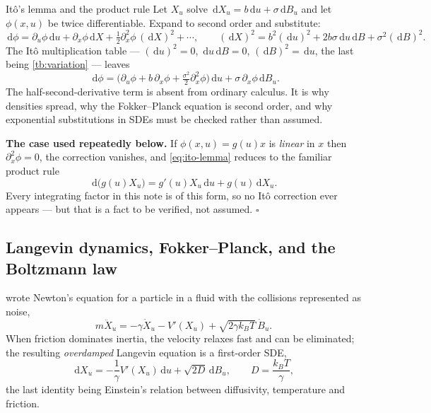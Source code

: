 \documentclass[11pt,a4paper]{article}
\newcommand{\dd}{\,\mathrm d}
\newcounter{toolbox}
\begin{document}
\begin{toolbox}{It\^o's lemma and the product rule}\label{tb:ito-lemma}
Let $X_u$ solve $\dd X_u=b\dd u+\sigma\dd B_u$ and let $\phi(x,u)$ be twice differentiable.
Expand to second order and substitute:
\[
 \dd\phi
 =\partial_u\phi\dd u+\partial_x\phi\dd X+\tfrac12\partial_x^2\phi\,(\dd X)^2+\cdots,
 \qquad
 (\dd X)^2=b^2(\dd u)^2+2b\sigma\dd u\dd B+\sigma^2(\dd B)^2 .
\]
The It\^o multiplication table --- $(\dd u)^2=0$, $\dd u\dd B=0$,
$(\dd B)^2=\dd u$, the last being \cref{tb:variation} --- leaves
\begin{equation}
 \boxed{\;\dd\phi
 =\Big(\partial_u\phi+b\,\partial_x\phi+\tfrac{\sigma^2}{2}\partial_x^2\phi\Big)\dd u
 +\sigma\,\partial_x\phi\dd B_u .}
 \label{eq:ito-lemma}
\end{equation}
The half-second-derivative term is absent from ordinary calculus. It is why densities spread,
why the Fokker--Planck equation is second order, and why exponential substitutions in SDEs
must be checked rather than assumed.

\textbf{The case used repeatedly below.} If $\phi(x,u)=g(u)x$ is \emph{linear} in $x$ then
$\partial_x^2\phi=0$, the correction vanishes, and \eqref{eq:ito-lemma} reduces to the
familiar product rule
\begin{equation}
 \dd\big(g(u)X_u\big)=g'(u)X_u\dd u+g(u)\dd X_u .
 \label{eq:product-rule}
\end{equation}
Every integrating factor in this note is of this form, so no It\^o correction ever appears ---
but that is a fact to be verified, not assumed. \hfill$\square$
\end{toolbox}

\subsection{Langevin dynamics, Fokker--Planck, and the Boltzmann law}\label{sec:langevin}

\citet{langevin1908theorie} wrote Newton's equation for a particle in a fluid with the
collisions represented as noise,
\begin{equation}
 m\ddot X_u=-\gamma\dot X_u-V'(X_u)+\sqrt{2\gamma k_BT}\,\dot B_u .
 \label{eq:langevin-full}
\end{equation}
When friction dominates inertia, the velocity relaxes fast and can be eliminated; the
resulting \emph{overdamped} Langevin equation is a first-order SDE,
\begin{equation}
 \dd X_u=-\frac{1}{\gamma}V'(X_u)\dd u+\sqrt{2D}\dd B_u,
 \qquad D=\frac{k_BT}{\gamma},
 \label{eq:langevin-overdamped}
\end{equation}
the last identity being Einstein's relation between diffusivity, temperature and friction.
\end{document}
